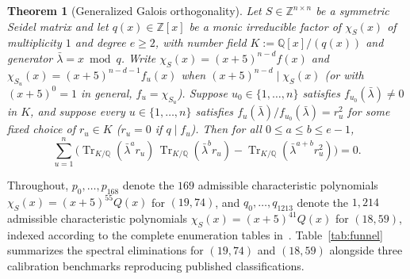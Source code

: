 \documentclass[11pt,reqno]{amsart}
\newtheorem{theorem}{Theorem}[section]
\theoremstyle{definition}
\theoremstyle{remark}
\DeclareMathOperator{\Tr}{Tr}
\begin{document}
\begin{theorem}[Generalized Galois orthogonality]\label{thm:galois}
Let $S \in \mathbb{Z}^{n \times n}$ be a symmetric Seidel matrix and let $q(x) \in \mathbb{Z}[x]$ be a monic irreducible factor of $\chi_S(x)$ of multiplicity $1$ and degree $e \ge 2$, with number field $K := \mathbb{Q}[x]/(q(x))$ and generator $\bar{\lambda} = x \bmod q$. Write $\chi_S(x) = (x+5)^{n-d} f(x)$ and $\chi_{S_u}(x) = (x+5)^{n-d-1} f_u(x)$ when $(x+5)^{n-d} \mid \chi_S(x)$ (or with $(x+5)^0 = 1$ in general, $f_u = \chi_{S_u}$). Suppose $u_0 \in \{1, \dots, n\}$ satisfies $f_{u_0}(\bar{\lambda}) \neq 0$ in $K$, and suppose every $u \in \{1, \dots, n\}$ satisfies $f_u(\bar{\lambda})/f_{u_0}(\bar{\lambda}) = r_u^2$ for some fixed choice of $r_u \in K$ ($r_u = 0$ if $q \mid f_u$). Then for all $0 \le a \le b \le e - 1$,
\begin{equation}\label{eq:galois}
  \sum_{u=1}^n \Big(\Tr_{K/\mathbb{Q}}(\bar{\lambda}^a r_u)\,\Tr_{K/\mathbb{Q}}(\bar{\lambda}^b r_u) - \Tr_{K/\mathbb{Q}}(\bar{\lambda}^{a+b} r_u^2)\Big) = 0.
\end{equation}
\end{theorem}

Throughout, $p_0, \dots, p_{168}$ denote the $169$ admissible characteristic polynomials $\chi_S(x) = (x+5)^{55} Q(x)$ for $(19, 74)$, and $q_0, \dots, q_{1213}$ denote the $1{,}214$ admissible characteristic polynomials $\chi_S(x) = (x+5)^{41} Q(x)$ for $(18, 59)$, indexed according to the complete enumeration tables in~\cite{CompanionFull}. Table~\ref{tab:funnel} summarizes the spectral eliminations for $(19, 74)$ and $(18, 59)$ alongside three calibration benchmarks reproducing published classifications.
\end{document}
